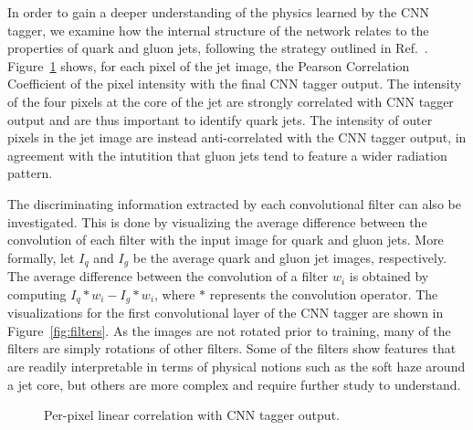 In order to gain a deeper understanding of the physics learned by the CNN tagger, 
we examine how the internal structure of the network relates to the properties of
quark and gluon jets, following the strategy outlined in Ref.~\cite{deOliveira:2015xxd}.
Figure~\ref{fig:correlation} shows, for each pixel of the jet image, the Pearson Correlation Coefficient
of the pixel intensity with the final CNN tagger output.
The intensity of the four pixels at the core of the jet are strongly correlated with CNN tagger output and
are thus important to identify quark jets. The intensity of outer pixels in the jet image are instead anti-correlated with
the CNN tagger output, in agreement with the intutition that gluon jets tend to feature a wider radiation pattern.

The discriminating information extracted by each convolutional filter can also be investigated.
This is done by visualizing the average difference between the convolution of each filter with the input image for quark 
and gluon jets.
More formally, let $I_q$ and $I_g$ be the average quark and gluon jet images, respectively.
The average difference between the convolution of a filter $w_i$ is obtained by computing $I_q * w_i - I_g * w_i$, where $*$ represents the convolution operator.
The visualizations for the first convolutional layer of the CNN tagger are shown in Figure~\ref{fig:filters}.
As the images are not rotated prior to training, 
many of the filters are simply rotations of other filters.  Some of the filters show features that are readily interpretable in terms of physical notions such as the soft haze around a jet core, but others are more complex and require further study to understand.  

\begin{figure}[htbp]
\begin{center}
\caption{
Per-pixel linear correlation with CNN tagger output.
}
\label{fig:correlation}
\end{center}
\end{figure}

